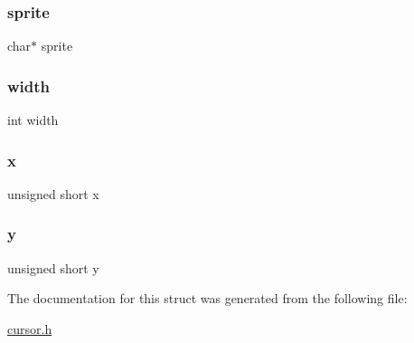 \hypertarget{structcursor_a6cffc5f58f86106ef1a6ea2f745efda1}{}\label{structcursor_a6cffc5f58f86106ef1a6ea2f745efda1} 
\subsubsection{\texorpdfstring{sprite}{sprite}}
{\footnotesize\ttfamily char$\ast$ sprite}

\hypertarget{structcursor_a2474a5474cbff19523a51eb1de01cda4}{}\label{structcursor_a2474a5474cbff19523a51eb1de01cda4} 
\subsubsection{\texorpdfstring{width}{width}}
{\footnotesize\ttfamily int width}

\hypertarget{structcursor_a6762fe907d546b988585b308b1c304c2}{}\label{structcursor_a6762fe907d546b988585b308b1c304c2} 
\subsubsection{\texorpdfstring{x}{x}}
{\footnotesize\ttfamily unsigned short x}

\hypertarget{structcursor_a8c9c5ccb800d748c485dfe2b6fa2cd9e}{}\label{structcursor_a8c9c5ccb800d748c485dfe2b6fa2cd9e} 
\subsubsection{\texorpdfstring{y}{y}}
{\footnotesize\ttfamily unsigned short y}



The documentation for this struct was generated from the following file\+:\begin{DoxyCompactItemize}
\item 
\hyperlink{cursor_8h}{cursor.\+h}\end{DoxyCompactItemize}
